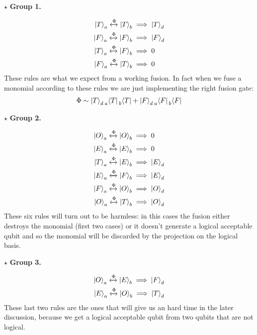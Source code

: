 \documentclass{article}
\begin{document}
$\star$ \textbf{Group 1.}

\begin{align*}
    \ket{T}_a \xleftrightarrow{\Phi} \ket{T}_b &\implies \ket{T}_d\\
    \ket{F}_a \xleftrightarrow{\Phi} \ket{F}_b &\implies \ket{F}_d\\
    \ket{T}_a \xleftrightarrow{\Phi} \ket{F}_b &\implies 0\\
    \ket{F}_a \xleftrightarrow{\Phi} \ket{T}_b &\implies 0
\end{align*}
These rules are what we expect from a working fusion. In fact when we fuse a monomial according to these rules we are just implementing the right fusion gate:
\begin{align}
    \label{goodfusion}
    \Phi \sim \ket{T}_{d}\prescript{}{a}{\bra{T}}\prescript{}{b}{\bra{T}}+\ket{F}_{d}\prescript{}{a}{\bra{F}}\prescript{}{b}{\bra{F}}
\end{align}

$\star$ \textbf{Group 2.}

\begin{align*}
    \ket{O}_a \xleftrightarrow{\Phi} \ket{O}_b &\implies 0\\
    \ket{E}_a \xleftrightarrow{\Phi} \ket{E}_b &\implies 0\\
    \ket{T}_a \xleftrightarrow{\Phi} \ket{E}_b &\implies \ket{E}_d\\
    \ket{E}_a \xleftrightarrow{\Phi} \ket{F}_b &\implies \ket{E}_d\\
    \ket{F}_a \xleftrightarrow{\Phi} \ket{O}_b &\implies \ket{O}_d\\
    \ket{O}_a \xleftrightarrow{\Phi} \ket{T}_b &\implies \ket{O}_d
\end{align*}
These six rules will turn out to be harmless: in this cases the fusion either destroys the monomial (first two cases) or it doesn't generate a logical acceptable qubit and so the monomial will be discarded by the projection on the logical basis.

$\star$ \textbf{Group 3.}

\begin{align}
    \label{oef}
    \ket{O}_a \xleftrightarrow{\Phi} \ket{E}_b \implies \ket{F}_d\\
    \label{eot}
    \ket{E}_a \xleftrightarrow{\Phi} \ket{O}_b \implies \ket{T}_d
\end{align}
These last two rules are the ones that will give us an hard time in the later discussion, because we get a logical acceptable qubit from two qubits that are not logical.
\end{document}
